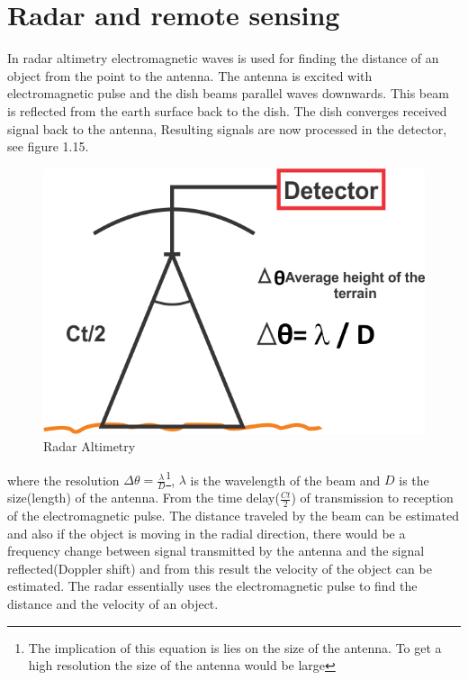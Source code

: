 \section{Radar and remote sensing}
In radar altimetry electromagnetic waves is used for finding the distance of an object from the point to the antenna. The antenna is excited with electromagnetic pulse and the dish beams parallel  waves downwards. This beam is reflected from the earth surface back to the dish. The dish converges received signal back to the antenna, Resulting signals are now processed in the detector, see figure 1.15.
\begin{figure}[h]
\centering
\includegraphics[scale=0.6]{./graphics/New}
\caption{Radar Altimetry}
\end{figure}

where the resolution $\Delta \theta = \frac{\lambda}{D}$\footnote{The implication of this equation is lies on the size of the antenna. To get a high resolution the size of the antenna would be large}, $\lambda$ is the wavelength of the beam and $D$ is the size(length) of the antenna. 
From the time delay($\frac{C t}{2}$) of transmission to reception of the electromagnetic pulse. The distance traveled by the beam can be estimated and also if the object is moving in the radial direction, there would be a frequency change between  signal transmitted by the antenna and the signal reflected(Doppler shift) and from this result the velocity of the object can be estimated. The radar essentially uses the electromagnetic pulse to find the distance and the velocity of an object.\\

